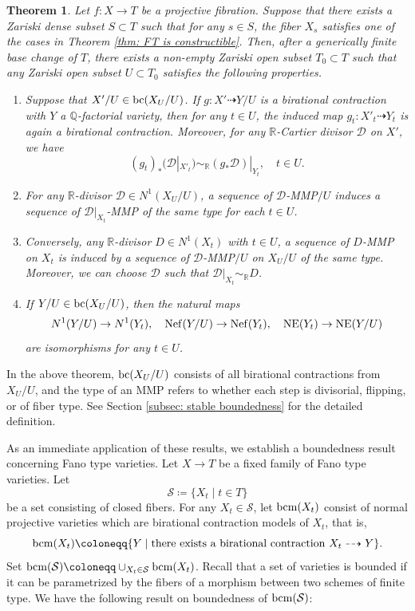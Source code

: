 \documentclass[11pt,oneside,reqno]{amsart}
\numberwithin{equation}{section}
\newtheorem{theorem}[proposition]{Theorem}
\theoremstyle{definition}
\newcommand{\Nef}{{\rm {Nef}}}
\newcommand{\bc}{{\rm {bc}}}
\newcommand{\NE}{{\rm {NE}}}
\newcommand{\bQ}{\mathbb{Q}}
\newcommand{\bR}{\mathbb{R}}
\newcommand{\mD}{\mathcal{D}}
\newcommand{\mS}{\mathcal{S}}
\begin{document}
\begin{theorem}\label{mainthm: mmp}
Let $f: X \to T$ be a projective fibration. Suppose that there exists a Zariski dense subset $S\subset T$ such that for any $s\in S$, the fiber $X_s$ satisfies one of the cases in Theorem \ref{thm: FT is constructible}. Then, after a generically finite base change of $T$, there exists a non-empty Zariski open subset $T_0 \subset T$ such that any Zariski open subset $U \subset T_0$ satisfies the following properties.
\begin{enumerate}
\item Suppose that $X'/U \in \bc(X_U/U)$. If $g: X' \dashrightarrow Y/U$ is a birational contraction with $Y$ a $\bQ$-factorial variety, then for any $t \in U$, the induced map $g_t: X'_t \dashrightarrow Y_t$ is again a birational contraction. Moreover, for any $\bR$-Cartier divisor $\mD$ on $X'$, we have
\[
(g_t)_*(\mD|_{X'_t}) \sim_{\bR} (g_*\mD)|_{Y_t}, \quad t \in U.
\]
\item For any $\bR$-divisor $\mD\in N^1(X_U/U)$, a sequence of $\mD$-MMP$/U$ induces a sequence of $\mD|_{X_t}$-MMP of the same type for each $t\in U$. 
\item Conversely, any $\bR$-divisor $D\in N^1(X_t)$ with $t\in U$, a sequence of $D$-MMP on $X_t$ is induced by a sequence of $\mD$-MMP$/U$ on $X_U/U$ of the same type. Moreover, we can choose $\mD$ such that $\mD|_{X_t}\sim_\bR D$. 
\item If $Y/U\in \bc(X_{U}/U)$, then the natural maps
\[
N^1(Y/U) \to N^1(Y_t), \quad \Nef(Y/U) \to \Nef(Y_t), \quad \NE(Y_t) \to \NE(Y/U)
\] are isomorphisms for any $t\in U$.
\end{enumerate}
\end{theorem} 

In the above theorem, $\bc(X_U/U)$ consists of all birational contractions from $X_U/U$, and the type of an MMP refers to whether each step is divisorial, flipping, or of fiber type. See Section \ref{subsec: stable boundedness} for the detailed definition.

As an immediate application of these results, we establish a boundedness result concerning Fano type varieties. Let $X \to T$ be a fixed family of Fano type varieties. Let 
\[
\mS \coloneqq \{X_t \mid t\in T\}
\]be a set consisting of closed fibers. For any $X_t\in \mS$, let ${\rm bcm}(X_t)$ consist of normal projective varieties which are birational contraction models of $X_t$, that is,
\[
{\rm bcm}(X_t)\coloneqq\{Y \mid \text{there exists a birational contraction~} X_t\dashrightarrow Y \}.
\] 
Set ${\rm bcm}(\mS)\coloneqq\cup_{X_t\in \mS} {\rm bcm}(X_t)$. Recall that a set of varieties is bounded if it can be parametrized by the fibers of a morphism between two schemes of finite type. We have the following result on boundedness of ${\rm bcm}(\mS)$:
\end{document}
